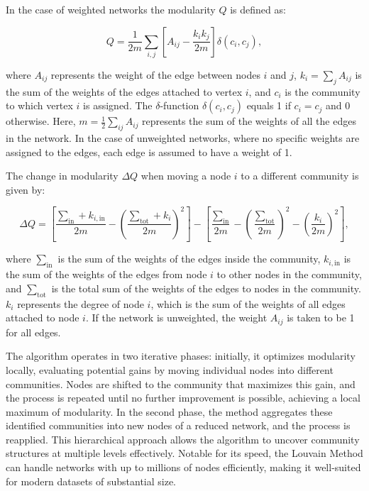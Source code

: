 In the case of weighted networks the modularity $Q$ is defined as:

\begin{equation}
	\label{eq:modularity}Q = \frac{1}{2m}\sum_{i,j}\left[ A_{ij}- \frac{k_{i}k_{j}}{2m}
	\right] \delta(c_{i}, c_{j}),
\end{equation}

where $A_{ij}$ represents the weight of the edge between nodes $i$ and $j$,
$k_{i}= \sum_{j}A_{ij}$ is the sum of the weights of the edges attached to
vertex $i$, and $c_{i}$ is the community to which vertex $i$ is assigned. The
$\delta$-function $\delta(c_{i}, c_{j})$ equals 1 if $c_{i}= c_{j}$ and 0
otherwise. Here, $m = \frac{1}{2}\sum_{ij}A_{ij}$ represents the sum of the
weights of all the edges in the network. In the case of unweighted networks,
where no specific weights are assigned to the edges, each edge is assumed to have
a weight of 1.

The change in modularity $\Delta Q$ when moving a node $i$ to a different
community is given by:

\begin{equation}
	\label{eq:delta_modularity}\Delta Q = \left[ \frac{\sum_{\text{in}}+ k_{i, \text{in}}}{2m}
	- \left( \frac{\sum_{\text{tot}}+ k_{i}}{2m}\right)^{2}\right] - \left[ \frac{\sum_{\text{in}}}{2m}
	- \left( \frac{\sum_{\text{tot}}}{2m}\right)^{2}- \left( \frac{k_{i}}{2m}\right
	)^{2}\right],
\end{equation}



where $\sum_{\text{in}}$ is the sum of the weights of the edges inside the community,
$k_{i, \text{in}}$ is the sum of the weights of the edges from node $i$ to other
nodes in the community, and $\sum_{\text{tot}}$ is the total sum of the weights of
the edges to nodes in the community. $k_{i}$ represents the degree of node $i$, which
is the sum of the weights of all edges attached to node $i$. If the network is
unweighted, the weight $A_{ij}$ is taken to be 1 for all edges.

The algorithm operates in two iterative phases: initially, it optimizes modularity
locally, evaluating potential gains by moving individual nodes into different
communities. Nodes are shifted to the community that maximizes this gain, and
the process is repeated until no further improvement is possible, achieving a local
maximum of modularity. In the second phase, the method aggregates these identified
communities into new nodes of a reduced network, and the process is reapplied. This
hierarchical approach allows the algorithm to uncover community structures at multiple
levels effectively. Notable for its speed, the Louvain Method can handle networks
with up to millions of nodes efficiently, making it well-suited for modern
datasets of substantial size. \parencite{Blondel_2008}

